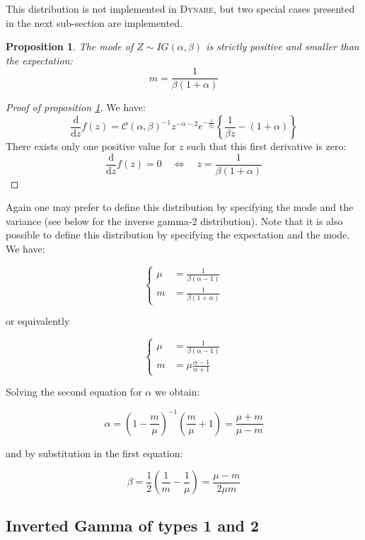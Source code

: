 \documentclass{amsart}
\theoremstyle{plain}
\newtheorem{proposition}{Proposition}[section]
\theoremstyle{remark}
\numberwithin{equation}{section}
\newcommand{\Dynare}{\textsc{Dynare}}
\begin{document}
This distribution is not implemented in \Dynare, but two special cases presented in the next sub-section are implemented.\newline

\begin{proposition}\label{InvertedGammaMode}
  The mode of $Z\sim IG(\alpha,\beta)$ is strictly positive and smaller than the expectation:
  \[
    m = \frac{1}{\beta(1+\alpha)}
  \]
\end{proposition}

\begin{proof}[Proof of proposition \ref{InvertedGammaMode}]
  We have:
  \[
    \frac{\mathrm d}{\mathrm dz}f(z) = \mathcal C(\alpha,\beta)^{-1}z^{-\alpha-2}e^{-\frac{1}{\beta z}}\left\{\frac{1}{\beta z}-(1+\alpha)\right\}
  \]
  There exists only one positive value for $z$ such that this first derivative is zero:
  \[
    \frac{\mathrm d}{\mathrm dz}f(z) = 0 \quad \Leftrightarrow \quad z = \frac{1}{\beta(1+\alpha)}
  \]
\end{proof}

Again one may prefer to define this distribution by specifying the mode and the
variance (see below for the inverse gamma-2 distribution). Note that it is also
possible to define this distribution by specifying the expectation and the mode. We have:

\[
  \begin{cases}
    \mu &= \frac{1}{\beta(\alpha-1)}\\
    m &= \frac{1}{\beta(1+\alpha)}
  \end{cases}
\]

or equivalently

\[
  \begin{cases}
    \mu &= \frac{1}{\beta(\alpha-1)}\\
    m &= \mu\frac{\alpha-1}{\alpha+1}
  \end{cases}
\]

Solving the second equation for $\alpha$ we obtain:

\[
\alpha = \left(1-\frac{m}{\mu}\right)^{-1}\left(\frac{m}{\mu}+1\right) = \frac{\mu+m}{\mu-m}
\]

and by substitution in the first equation:

\[
\beta = \frac{1}{2}\left(\frac{1}{m}-\frac{1}{\mu}\right) = \frac{\mu-m}{2\mu m}
\]

\subsection{Inverted Gamma of types 1 and 2}\label{sec:InvertedGammaDistributionsOfType1And2}
\end{document}
